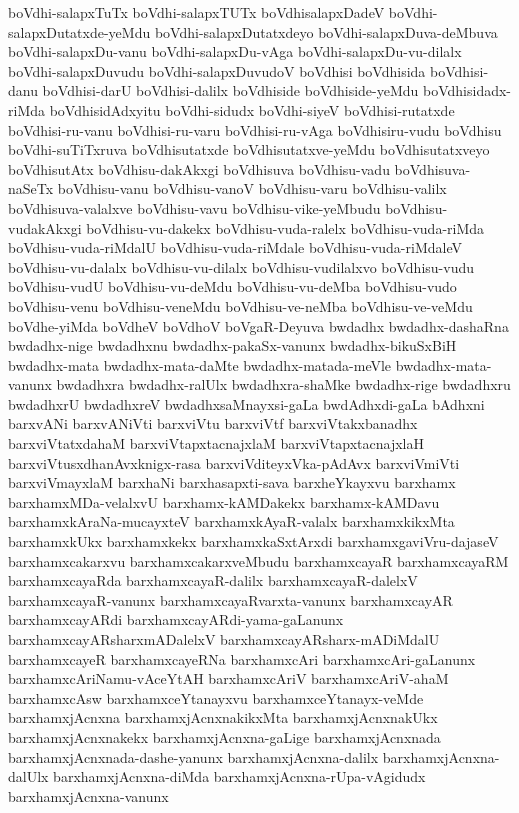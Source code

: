 {boVdhi-salapxTuTx
boVdhi-salapxTUTx
boVdhisalapxDadeV
boVdhi-salapxDutatxde-yeMdu
boVdhi-salapxDutatxdeyo
boVdhi-salapxDuva-deMbuva
boVdhi-salapxDu-vanu
boVdhi-salapxDu-vAga
boVdhi-salapxDu-vu-dilalx
boVdhi-salapxDuvudu
boVdhi-salapxDuvudoV
boVdhisi
boVdhisida
boVdhisi-danu
boVdhisi-darU
boVdhisi-dalilx
boVdhiside
boVdhiside-yeMdu
boVdhisidadx-riMda
boVdhisidAdxyitu
boVdhi-sidudx
boVdhi-siyeV
boVdhisi-rutatxde
boVdhisi-ru-vanu
boVdhisi-ru-varu
boVdhisi-ru-vAga
boVdhisiru-vudu
boVdhisu
boVdhi-suTiTxruva
boVdhisutatxde
boVdhisutatxve-yeMdu
boVdhisutatxveyo
boVdhisutAtx
boVdhisu-dakAkxgi
boVdhisuva
boVdhisu-vadu
boVdhisuva-naSeTx
boVdhisu-vanu
boVdhisu-vanoV
boVdhisu-varu
boVdhisu-valilx
boVdhisuva-valalxve
boVdhisu-vavu
boVdhisu-vike-yeMbudu
boVdhisu-vudakAkxgi
boVdhisu-vu-dakekx
boVdhisu-vuda-ralelx
boVdhisu-vuda-riMda
boVdhisu-vuda-riMdalU
boVdhisu-vuda-riMdale
boVdhisu-vuda-riMdaleV
boVdhisu-vu-dalalx
boVdhisu-vu-dilalx
boVdhisu-vudilalxvo
boVdhisu-vudu
boVdhisu-vudU
boVdhisu-vu-deMdu
boVdhisu-vu-deMba
boVdhisu-vudo
boVdhisu-venu
boVdhisu-veneMdu
boVdhisu-ve-neMba
boVdhisu-ve-veMdu
boVdhe-yiMda
boVdheV
boVdhoV
boVgaR-Deyuva
bwdadhx
bwdadhx-dashaRna
bwdadhx-nige
bwdadhxnu
bwdadhx-pakaSx-vanunx
bwdadhx-bikuSxBiH
bwdadhx-mata
bwdadhx-mata-daMte
bwdadhx-matada-meVle
bwdadhx-mata-vanunx
bwdadhxra
bwdadhx-ralUlx
bwdadhxra-shaMke
bwdadhx-rige
bwdadhxru
bwdadhxrU
bwdadhxreV
bwdadhxsaMnayxsi-gaLa
bwdAdhxdi-gaLa
bAdhxni
barxvANi
barxvANiVti
barxviVtu
barxviVtf
barxviVtakxbanadhx
barxviVtatxdahaM
barxviVtapxtacnajxlaM
barxviVtapxtacnajxlaH
barxviVtusxdhanAvxknigx-rasa
barxviVditeyxVka-pAdAvx
barxviVmiVti
barxviVmayxlaM
barxhaNi
barxhasapxti-sava
barxheYkayxvu
barxhamx
barxhamxMDa-velalxvU
barxhamx-kAMDakekx
barxhamx-kAMDavu
barxhamxkAraNa-mucayxteV
barxhamxkAyaR-valalx
barxhamxkikxMta
barxhamxkUkx
barxhamxkekx
barxhamxkaSxtArxdi
barxhamxgaviVru-dajaseV
barxhamxcakarxvu
barxhamxcakarxveMbudu
barxhamxcayaR
barxhamxcayaRM
barxhamxcayaRda
barxhamxcayaR-dalilx
barxhamxcayaR-dalelxV
barxhamxcayaR-vanunx
barxhamxcayaRvarxta-vanunx
barxhamxcayAR
barxhamxcayARdi
barxhamxcayARdi-yama-gaLanunx
barxhamxcayARsharxmADalelxV
barxhamxcayARsharx-mADiMdalU
barxhamxcayeR
barxhamxcayeRNa
barxhamxcAri
barxhamxcAri-gaLanunx
barxhamxcAriNamu-vAceYtAH
barxhamxcAriV
barxhamxcAriV-ahaM
barxhamxcAsw
barxhamxceYtanayxvu
barxhamxceYtanayx-veMde
barxhamxjAcnxna
barxhamxjAcnxnakikxMta
barxhamxjAcnxnakUkx
barxhamxjAcnxnakekx
barxhamxjAcnxna-gaLige
barxhamxjAcnxnada
barxhamxjAcnxnada-dashe-yanunx
barxhamxjAcnxna-dalilx
barxhamxjAcnxna-dalUlx
barxhamxjAcnxna-diMda
barxhamxjAcnxna-rUpa-vAgidudx
barxhamxjAcnxna-vanunx
}
